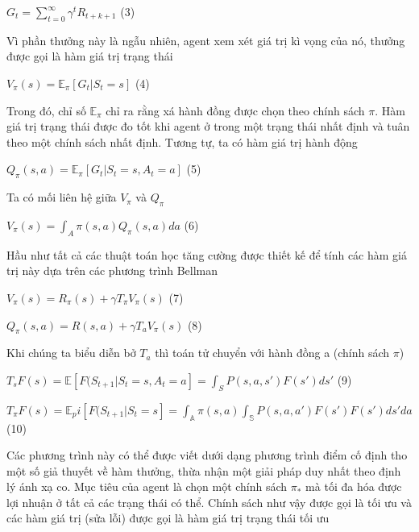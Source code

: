 \documentclass[14pt]{extreport}
\begin{document}
 \begin{center}
 $G_t=\sum_{t=0}^ {\infty} \gamma ^t R_{t+k+1}$     (3)
 \end{center}
 
 Vì phần thưởng này là ngẫu nhiên, agent xem xét giá trị kì vọng của nó, thưởng được gọi là hàm giá trị trạng thái
 
 \begin{center}
 $V_ \pi (s)=\mathbb{E}_ \pi [G_t|S_t=s]$         (4) 
 \end{center}
 
 Trong đó, chỉ số $\mathbb{E}_ \pi$ chỉ ra rằng xá hành đồng được chọn theo chính sách $\pi$. Hàm giá trị trạng thái được đo tốt khi agent ở trong một trạng thái nhất định và tuân theo một chính sách nhất định. Tương tự, ta có hàm giá trị hành động
 
 \begin{center}
 $Q_ \pi (s,a)= \mathbb{E}_ \pi [G_t|S_t=s,A_t=a]$      (5)
 \end{center}
 
 Ta có mối liên hệ giữa $V_ \pi$ và $Q_ \pi$
 
 \begin{center}
 $V_ \pi (s)= \int _{A} \pi (s,a) Q_ \pi (s,a) da$      (6)
 \end{center}
 
 Hầu như tất cả các thuật toán học tăng cường được thiết kế để tính các hàm giá trị này dựa trên các phương trình Bellman
 
 \begin{center}
 $V_ {\pi} (s)=R_{\pi} (s)+ \gamma T_{\pi}V_{\pi}(s)    $     (7)
 
 $Q_{\pi}(s,a) = R(s,a)+ \gamma T_a V_ {\pi}(s) $        (8)
 \end{center}
 
 Khi chúng ta biểu diễn bở $T_a$ thì toán tử chuyển với hành đồng a (chính sách $\pi$)
 
 \begin{center}
 $T_s F(s)=\mathbb{E}[F(S_{t+1} |S_t = s,A_t =a]= \int _{S} P(s,a,s') F(s') ds'$  (9)
 
 $T_ \pi F(s)= \mathbb{E}_ pi [F(S_{t+1} |S_t = s]= \int _{\mathbb{A} } \pi (s,a) \int _{\mathbb{S}} P(s,a,a') F(s') F(s') ds' da$  (10)
 \end{center}
 
 Các phương trình này có thể được viết dưới dạng phương trình điểm cố định tho một số giả thuyết về hàm thưởng, thừa nhận một giải pháp duy nhất theo định lý ánh xạ co. Mục tiêu của agent là chọn một chính sách $\pi_{*}$ mà tối đa hóa được lợi nhuận ở tất cả các trạng thái có thể. Chính sách như vậy được gọi là tối ưu và các hàm giá trị (sửa lỗi) được gọi là hàm giá trị trạng thái tối ưu
 
\end{document}

